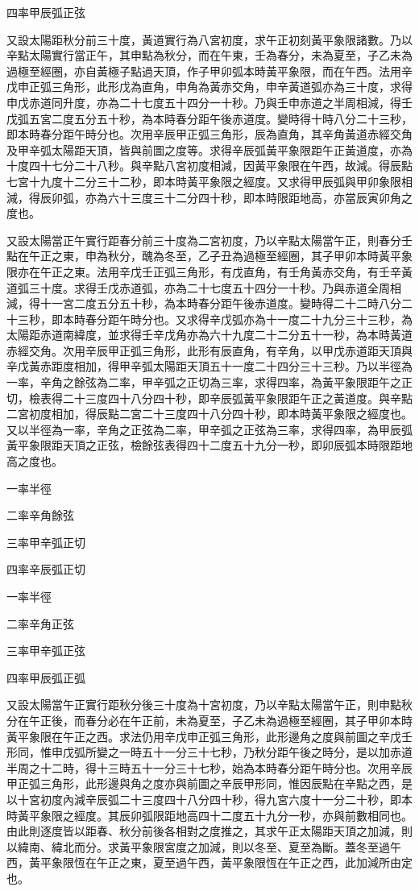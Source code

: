 \begin{pinyinscope}
四率甲辰弧正弦

又設太陽距秋分前三十度，黃道實行為八宮初度，求午正初刻黃平象限諸數。乃以辛點太陽實行當正午，其申點為秋分，而在午東，壬為春分，未為夏至，子乙未為過極至經圈，亦自黃極子點過天頂，作子甲卯弧本時黃平象限，而在午西。法用辛戊申正弧三角形，此形戊為直角，申角為黃赤交角，申辛黃道弧亦為三十度，求得申戊赤道同升度，亦為二十七度五十四分一十秒。乃與壬申赤道之半周相減，得壬戊弧五宮二度五分五十秒，為本時春分距午後赤道度。變時得十時八分二十三秒，即本時春分距午時分也。次用辛辰甲正弧三角形，辰為直角，其辛角黃道赤經交角及甲辛弧太陽距天頂，皆與前圖之度等。求得辛辰弧黃平象限距午正黃道度，亦為十度四十七分二十八秒。與辛點八宮初度相減，因黃平象限在午西，故減。得辰點七宮十九度十二分三十二秒，即本時黃平象限之經度。又求得甲辰弧與甲卯象限相減，得辰卯弧，亦為六十三度三十二分四十秒，即本時限距地高，亦當辰寅卯角之度也。

又設太陽當正午實行距春分前三十度為二宮初度，乃以辛點太陽當午正，則春分壬點在午正之東，申為秋分，醜為冬至，乙子丑為過極至經圈，其子甲卯本時黃平象限亦在午正之東。法用辛戊壬正弧三角形，有戊直角，有壬角黃赤交角，有壬辛黃道弧三十度。求得壬戊赤道弧，亦為二十七度五十四分一十秒。乃與赤道全周相減，得十一宮二度五分五十秒，為本時春分距午後赤道度。變時得二十二時八分二十三秒，即本時春分距午時分也。又求得辛戊弧亦為十一度二十九分三十三秒，為太陽距赤道南緯度，並求得壬辛戊角亦為六十九度二十二分五十一秒，為本時黃道赤經交角。次用辛辰甲正弧三角形，此形有辰直角，有辛角，以甲戊赤道距天頂與辛戊黃赤距度相加，得甲辛弧太陽距天頂五十一度二十四分三十三秒。乃以半徑為一率，辛角之餘弦為二率，甲辛弧之正切為三率，求得四率，為黃平象限距午之正切，檢表得二十三度四十八分四十秒，即辛辰弧黃平象限距午正之黃道度。與辛點二宮初度相加，得辰點二宮二十三度四十八分四十秒，即本時黃平象限之經度也。又以半徑為一率，辛角之正弦為二率，甲辛弧之正弦為三率，求得四率，為甲辰弧黃平象限距天頂之正弦，檢餘弦表得四十二度五十九分一秒，即卯辰弧本時限距地高之度也。

一率半徑

二率辛角餘弦

三率甲辛弧正切

四率辛辰弧正切

一率半徑

二率辛角正弦

三率甲辛弧正弦

四率甲辰弧正弧

又設太陽當午正實行距秋分後三十度為十宮初度，乃以辛點太陽當午正，則申點秋分在午正後，而春分必在午正前，未為夏至，子乙未為過極至經圈，其子甲卯本時黃平象限在午正之西。求法仍用辛戊申正弧三角形，此形邊角之度與前圖之辛戊壬形同，惟申戊弧所變之一時五十一分三十七秒，乃秋分距午後之時分，是以加赤道半周之十二時，得十三時五十一分三十七秒，始為本時春分距午時分也。次用辛辰甲正弧三角形，此形邊與角之度亦與前圖之辛辰甲形同，惟因辰點在辛點之西，是以十宮初度內減辛辰弧二十三度四十八分四十秒，得九宮六度十一分二十秒，即本時黃平象限之經度。其辰卯弧限距地高四十二度五十九分一秒，亦與前數相同也。由此則逐度皆以距春、秋分前後各相對之度推之，其求午正太陽距天頂之加減，則以緯南、緯北而分。求黃平象限宮度之加減，則以冬至、夏至為斷。蓋冬至過午西，黃平象限恆在午正之東，夏至過午西，黃平象限恆在午正之西，此加減所由定也。


\end{pinyinscope}
